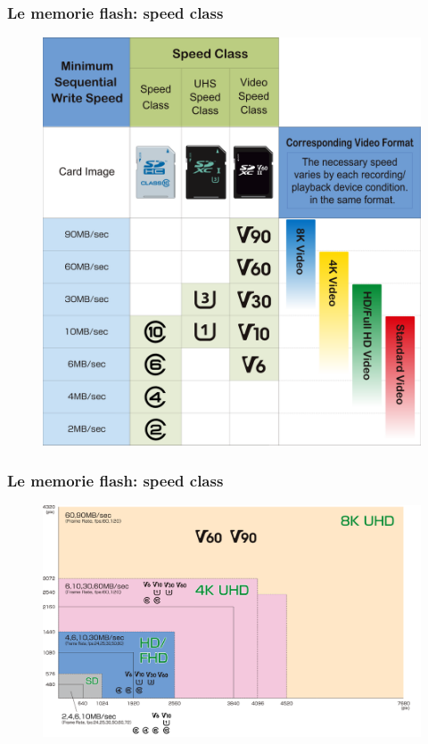 \begin{frame}
	\frametitle{Le memorie flash: speed class}
	
	\begin{figure}[!htbp]
		\centering
		\includegraphics[width=0.55\linewidth]{images/5_memory/flash_5.png}
	\end{figure}
\end{frame}

\begin{frame}
	\frametitle{Le memorie flash: speed class}
	
	\begin{figure}[!htbp]
		\centering
		\includegraphics[width=1.0\linewidth]{images/5_memory/flash_6.png}
	\end{figure}
\end{frame}


